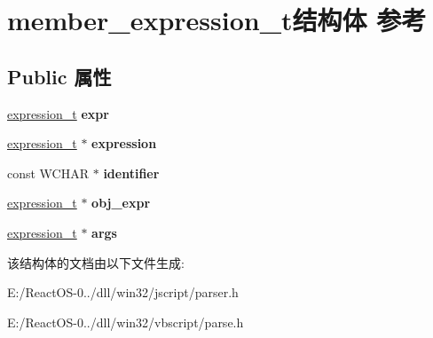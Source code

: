 \hypertarget{structmember__expression__t}{}\section{member\+\_\+expression\+\_\+t结构体 参考}
\label{structmember__expression__t}
\subsection*{Public 属性}
\begin{DoxyCompactItemize}
\item 
\mbox{\label{structmember__expression__t_a6d3eefffc6a5eb3b384e8a4c9ec294d7}} 
\hyperlink{struct__expression__t}{expression\+\_\+t} {\bfseries expr}
\item 
\mbox{\label{structmember__expression__t_afb9c635e7cd1db68687b11bee022f7f5}} 
\hyperlink{struct__expression__t}{expression\+\_\+t} $\ast$ {\bfseries expression}
\item 
\mbox{\label{structmember__expression__t_a462d15aab0d1f45e6c15760b0457e0d7}} 
const W\+C\+H\+AR $\ast$ {\bfseries identifier}
\item 
\mbox{\label{structmember__expression__t_a0df1c601bd180f7ddb0b4d5ab3affbb3}} 
\hyperlink{struct__expression__t}{expression\+\_\+t} $\ast$ {\bfseries obj\+\_\+expr}
\item 
\mbox{\label{structmember__expression__t_a8ca39345d03ec8534e162adfe8a6fcdb}} 
\hyperlink{struct__expression__t}{expression\+\_\+t} $\ast$ {\bfseries args}
\end{DoxyCompactItemize}


该结构体的文档由以下文件生成\+:\begin{DoxyCompactItemize}
\item 
E\+:/\+React\+O\+S-\/0../dll/win32/jscript/parser.\+h\item 
E\+:/\+React\+O\+S-\/0../dll/win32/vbscript/parse.\+h\end{DoxyCompactItemize}
